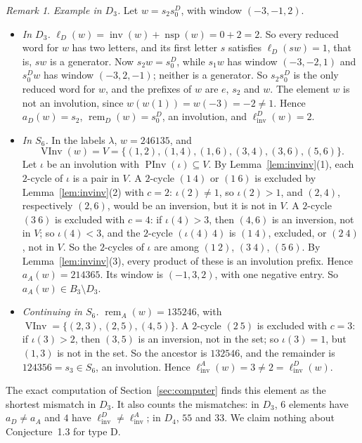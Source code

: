 \documentclass[11pt]{amsart}
\theoremstyle{definition}
\theoremstyle{remark}
\newtheorem{remark}[theorem]{Remark}
\numberwithin{equation}{section}
\newcommand{\linv}{\ell_{\mathrm{inv}}}
\DeclareMathOperator{\rem}{rem}
\DeclareMathOperator{\PInv}{PInv}
\DeclareMathOperator{\VInv}{VInv}
\DeclareMathOperator{\invB}{inv}
\DeclareMathOperator{\nspB}{nsp}
\begin{document}
\begin{remark}
\emph{Example in \(D_3\).} Let \(w=s_2s_0^D\), with window \((-3,-1,2)\).
\begin{itemize}
\item \emph{In \(D_3\).} \(\ell_D(w)=\invB(w)+\nspB(w)=0+2=2\). So every reduced word for \(w\) has two letters, and its first letter \(s\) satisfies \(\ell_D(sw)=1\), that is, \(sw\) is a generator. Now \(s_2w=s_0^D\), while \(s_1w\) has window \((-3,-2,1)\) and \(s_0^Dw\) has window \((-3,2,-1)\); neither is a generator. So \(s_2s_0^D\) is the only reduced word for \(w\), and the prefixes of \(w\) are \(e\), \(s_2\) and \(w\). The element \(w\) is not an involution, since \(w(w(1))=w(-3)=-2\neq1\). Hence \(a_D(w)=s_2\), \(\rem_D(w)=s_0^D\), an involution, and \(\linv^D(w)=2\).
\item \emph{In \(S_6\).} In the labels \(\lambda\), \(w=246135\), and
\[
\VInv(w)=V=\{(1,2),(1,4),(1,6),(3,4),(3,6),(5,6)\}.
\]
Let \(\iota\) be an involution with \(\PInv(\iota)\subseteq V\). By Lemma~\ref{lem:invinv}(1), each \(2\)-cycle of \(\iota\) is a pair in \(V\). A \(2\)-cycle \((1\ 4)\) or \((1\ 6)\) is excluded by Lemma~\ref{lem:invinv}(2) with \(c=2\): \(\iota(2)\neq1\), so \(\iota(2)>1\), and \((2,4)\), respectively \((2,6)\), would be an inversion, but it is not in \(V\). A \(2\)-cycle \((3\ 6)\) is excluded with \(c=4\): if \(\iota(4)>3\), then \((4,6)\) is an inversion, not in \(V\); so \(\iota(4)<3\), and the \(2\)-cycle \((\iota(4)\ 4)\) is \((1\ 4)\), excluded, or \((2\ 4)\), not in \(V\). So the \(2\)-cycles of \(\iota\) are among \((1\ 2)\), \((3\ 4)\), \((5\ 6)\). By Lemma~\ref{lem:invinv}(3), every product of these is an involution prefix. Hence \(a_A(w)=214365\). Its window is \((-1,3,2)\), with one negative entry. So \(a_A(w)\in B_3\setminus D_3\).
\item \emph{Continuing in \(S_6\).} \(\rem_A(w)=135246\), with \(\VInv=\{(2,3),(2,5),(4,5)\}\). A \(2\)-cycle \((2\ 5)\) is excluded with \(c=3\): if \(\iota(3)>2\), then \((3,5)\) is an inversion, not in the set; so \(\iota(3)=1\), but \((1,3)\) is not in the set. So the ancestor is \(132546\), and the remainder is \(124356=s_3\in S_6\), an involution. Hence \(\linv^A(w)=3\neq2=\linv^D(w)\).
\end{itemize}
The exact computation of Section~\ref{sec:computer} finds this element as the shortest mismatch in \(D_3\). It also counts the mismatches: in \(D_3\), \(6\) elements have \(a_D\neq a_A\) and \(4\) have \(\linv^D\neq\linv^A\); in \(D_4\), \(55\) and \(33\). We claim nothing about Conjecture~1.3 for type D.
\end{remark}
\end{document}
